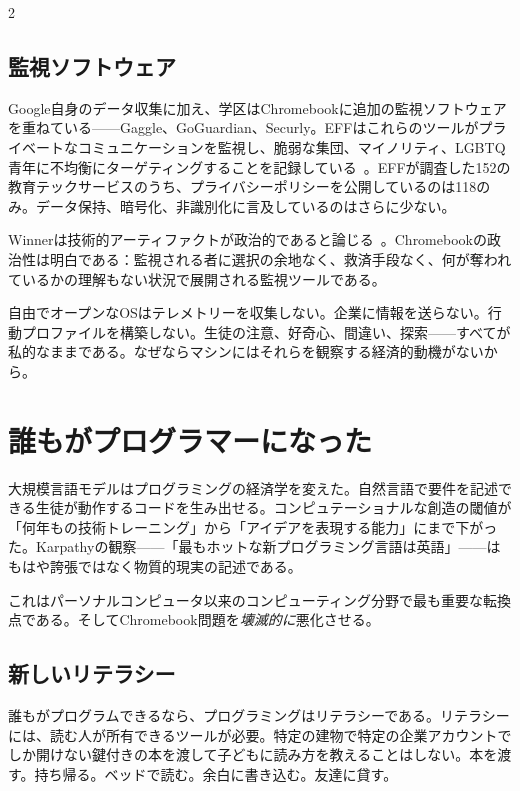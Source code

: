 \documentclass[11pt, a4paper]{article}
\begin{document}
\begin{multicols}{2}
\subsection{監視ソフトウェア}

Google自身のデータ収集に加え、学区はChromebookに追加の監視ソフトウェアを重ねている——Gaggle、GoGuardian、Securly。EFFはこれらのツールがプライベートなコミュニケーションを監視し、脆弱な集団、マイノリティ、LGBTQ青年に不均衡にターゲティングすることを記録している~\citep{eff2024monitoring}。EFFが調査した152の教育テックサービスのうち、プライバシーポリシーを公開しているのは118のみ。データ保持、暗号化、非識別化に言及しているのはさらに少ない。

Winnerは技術的アーティファクトが政治的であると論じる~\citep{winner1980artifacts}。Chromebookの政治性は明白である：監視される者に選択の余地なく、救済手段なく、何が奪われているかの理解もない状況で展開される監視ツールである。

自由でオープンなOSはテレメトリーを収集しない。企業に情報を送らない。行動プロファイルを構築しない。生徒の注意、好奇心、間違い、探索——すべてが私的なままである。なぜならマシンにはそれらを観察する経済的動機がないから。


\section{誰もがプログラマーになった}

大規模言語モデルはプログラミングの経済学を変えた。自然言語で要件を記述できる生徒が動作するコードを生み出せる。コンピュテーショナルな創造の閾値が「何年もの技術トレーニング」から「アイデアを表現する能力」にまで下がった。Karpathyの観察——「最もホットな新プログラミング言語は英語」——はもはや誇張ではなく物質的現実の記述である。

これはパーソナルコンピュータ以来のコンピューティング分野で最も重要な転換点である。そしてChromebook問題を\emph{壊滅的に}悪化させる。

\subsection{新しいリテラシー}

誰もがプログラムできるなら、プログラミングはリテラシーである。リテラシーには、読む人が所有できるツールが必要。特定の建物で特定の企業アカウントでしか開けない鍵付きの本を渡して子どもに読み方を教えることはしない。本を渡す。持ち帰る。ベッドで読む。余白に書き込む。友達に貸す。


\end{multicols}
\end{document}
